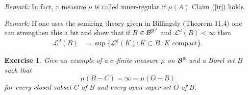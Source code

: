\documentclass[10pt,letterpaper,twocolumn]{article}
\newtheorem{exercise}{Exercise}
\begin{document}
{\em Remark:}
In fact, a measure $\mu$ is called inner-regular if $\mu(A)$  Claim (\ref{ir}) holds.


{\em Remark:}
If one uses the semiring theory given in Billingsly (Theorem 11.4) one can strengthen this a bit and show that
if $B\in\mathcal B^{\Bbb R^d}$ and $\mathcal L^d(B)<\infty$ then
\begin{align*}
\mathcal L^d(B)  &= \sup \{ \mathcal L^d(K):  K\subset B,\, \text{$K$ compact}\}.
\end{align*}

\begin{exercise}
Give an example of a $\sigma$-finite measure $\mu$ on $\mathcal B^{\Bbb R}$ and a Borel set $B$ such that
\[ \mu(B-C)= \infty = \mu(O-B) \]
for every closed subset $C$ of $B$ and every open super set $O$ of $B$.
\end{exercise}

%
%
\end{document}
